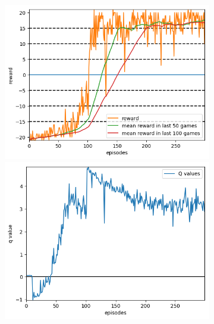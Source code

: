 \documentclass[10pt]{article}
\begin{document}
\begin{figure}
	\centering
	\begin{subfigure}{0.49\textwidth}
		\begin{minipage}{\linewidth}
			\includegraphics[width=\linewidth]{prior_DDQN_reward.png}
		\end{minipage}\vfill
		\begin{minipage}{\linewidth}
			\includegraphics[width=\linewidth]{prior_DDQN_qval.png}
		\end{minipage}\vfill
		\begin{minipage}{\linewidth}

\end{minipage}
\end{subfigure}
\end{figure}
\end{document}
